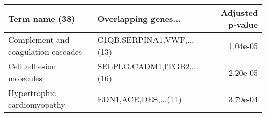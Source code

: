 \begin{tabular}{llr}
\toprule
                     Term name (38) &       Overlapping genes... &  Adjusted p-value \\
\midrule
Complement and coagulation cascades &  C1QB,SERPINA1,VWF,...(13) &          1.04e-05 \\
            Cell adhesion molecules & SELPLG,CADM1,ITGB2,...(16) &          2.20e-05 \\
        Hypertrophic cardiomyopathy &       EDN1,ACE,DES,...(11) &          3.79e-04 \\
\bottomrule
\end{tabular}
